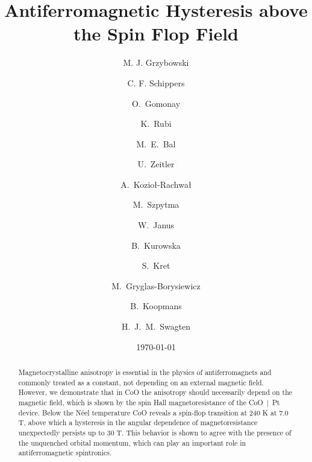 \documentclass[%
 aps,
prl,
superscriptaddress,
 amsmath,amssymb,
reprint,%
]{revtex4-2}
\begin{document}

\title[Antiferromagnetic Hysteresis above the Spin Flop Field]{Antiferromagnetic Hysteresis above the Spin Flop Field}

\author{M. J. Grzybowski}
\author{C. F. Schippers}
%
\author{O.~Gomonay}
\author{K.~Rubi}
\author{M.~E.~Bal}
\author{U.~Zeitler}
\author{A.~Kozioł-Rachwał}
\author{M.~Szpytma}
\author{W.~Janus}
\author{B.~Kurowska}
\author{S.~Kret}
\author{M.~Gryglas-Borysiewicz}
\author{B.~Koopmans}
\author{H.~J.~M.~Swagten}



\date{\today}%

\begin{abstract}
Magnetocrystalline anisotropy is essential in the physics of antiferromagnets and commonly treated as a constant, not depending on an external magnetic field. However, we demonstrate that in CoO the anisotropy should necessarily depend on the magnetic field, which is shown by the spin Hall magnetoresistance of the CoO~|~Pt device. Below the Néel temperature CoO reveals a spin-flop transition at 240 K at 7.0 T, above which a hysteresis in the angular dependence of magnetoresistance unexpectedly persists up to 30 T. This behavior is shown to agree with the presence of the unquenched orbital momentum, which can play an important role in antiferromagnetic spintronics.
\end{abstract}
\end{document}

